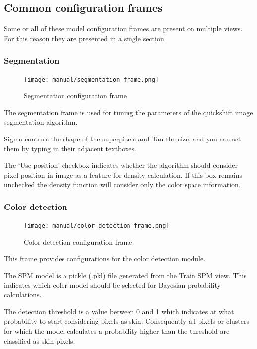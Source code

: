 \documentclass[12pt]{report}
\begin{document}
	\subsection{Common configuration frames} \label{configuration_frames}
	Some or all of these model configuration frames are present on multiple views. For this reason they are presented in a single section.
	
	\subsubsection{Segmentation}
	
	\begin{figure}
		\begin{center}
			\texttt{[image: manual/segmentation\_frame.png]}
		\end{center}
		\caption{Segmentation configuration frame}
	\end{figure}
	
	The segmentation frame is used for tuning the parameters of the quickshift image segmentation algorithm. 
	
	Sigma controls the shape of the superpixels and Tau the size, and you can set them by typing in their adjacent textboxes. 
	
	The ‘Use position’ checkbox indicates whether the algorithm should consider pixel position in image as a feature for density calculation. If this box remains unchecked the density function will consider only the color space information.
	
	\subsubsection{Color detection}
	
	\begin{figure}
		\begin{center}
			\texttt{[image: manual/color\_detection\_frame.png]}
		\end{center}
		\caption{Color detection configuration frame}
	\end{figure}
	
	This frame provides configurations for the color detection module.
	
	The SPM model is a pickle (.pkl) file generated from the Train SPM view. This indicates which color model should be selected for Bayesian probability calculations. 
	
	The detection threshold is a value between 0 and 1 which indicates at what probability to start considering pixels as skin. Consequently all pixels or clusters for which the model calculates a probability higher than the threshold are classified as skin pixels.
	
\end{document}
